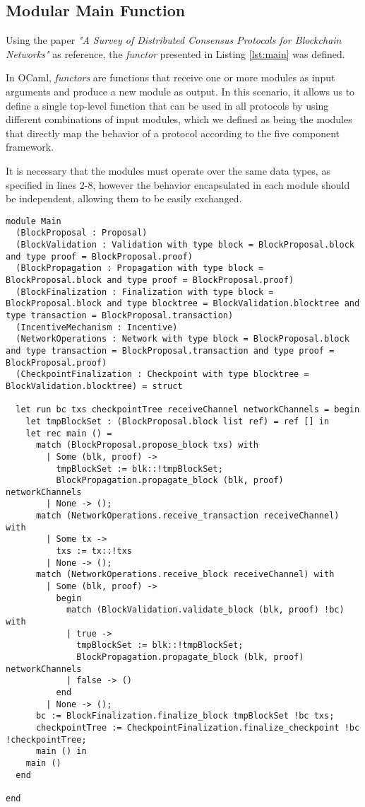 \subsection{Modular Main Function}

Using the paper \textit{"A Survey of Distributed Consensus Protocols for Blockchain Networks"} \cite{survey_bchain_networks} as reference, the \textit{functor} presented in Listing \ref{lst:main} was defined.

In OCaml, \textit{functors} are functions that receive one or more modules as input arguments and produce a new module as output. In this scenario, it allows us to define a single top-level function that can be used in all protocols by using different combinations of input modules, which we defined as being the modules that directly map the behavior of a protocol according to the five component framework.

It is necessary that the modules must operate over the same data types, as specified in lines 2-8, however the behavior encapsulated in each module should be independent, allowing them to be easily exchanged.

\begin{lstlisting}
module Main
  (BlockProposal : Proposal)
  (BlockValidation : Validation with type block = BlockProposal.block and type proof = BlockProposal.proof)
  (BlockPropagation : Propagation with type block = BlockProposal.block and type proof = BlockProposal.proof)
  (BlockFinalization : Finalization with type block = BlockProposal.block and type blocktree = BlockValidation.blocktree and type transaction = BlockProposal.transaction)
  (IncentiveMechanism : Incentive)
  (NetworkOperations : Network with type block = BlockProposal.block and type transaction = BlockProposal.transaction and type proof = BlockProposal.proof)
  (CheckpointFinalization : Checkpoint with type blocktree = BlockValidation.blocktree) = struct

  let run bc txs checkpointTree receiveChannel networkChannels = begin
    let tmpBlockSet : (BlockProposal.block list ref) = ref [] in
    let rec main () =
      match (BlockProposal.propose_block txs) with
        | Some (blk, proof) ->
          tmpBlockSet := blk::!tmpBlockSet;
          BlockPropagation.propagate_block (blk, proof) networkChannels
        | None -> ();
      match (NetworkOperations.receive_transaction receiveChannel) with
        | Some tx ->
          txs := tx::!txs
        | None -> ();
      match (NetworkOperations.receive_block receiveChannel) with
        | Some (blk, proof) ->
          begin
            match (BlockValidation.validate_block (blk, proof) !bc) with
            | true ->
              tmpBlockSet := blk::!tmpBlockSet;
              BlockPropagation.propagate_block (blk, proof) networkChannels
            | false -> ()
          end
        | None -> ();
      bc := BlockFinalization.finalize_block tmpBlockSet !bc txs;
      checkpointTree := CheckpointFinalization.finalize_checkpoint !bc !checkpointTree;
      main () in
    main ()
  end

end
\end{lstlisting}

